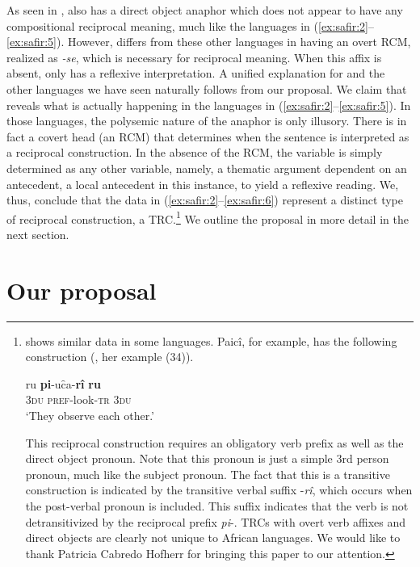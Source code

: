 \documentclass[output=paper]{langsci/langscibook}
\begin{document}
As seen in ,  also has a direct object anaphor which does not appear to have any compositional reciprocal meaning, much like the languages in (\ref{ex:safir:2}--\ref{ex:safir:5}). However,  differs from these other languages in having an overt RCM, realized as \textit{-se}, which is necessary for reciprocal meaning. When this affix is absent,  only has a reflexive interpretation. A unified explanation for  and the other languages we have seen naturally follows from our proposal. We claim that  reveals what is actually happening in the languages in (\ref{ex:safir:2}--\ref{ex:safir:5}). In those languages, the polysemic nature of the anaphor is only illusory. There is in fact a covert head (an RCM) that determines when the sentence is interpreted as a reciprocal construction. In the absence of the RCM, the variable is simply determined as any other variable, namely, a thematic argument dependent on an antecedent, a local antecedent in this instance, to yield a reflexive reading. We, thus, conclude that the data in (\ref{ex:safir:2}--\ref{ex:safir:6}) represent a distinct type of reciprocal construction, a TRC.\footnote{\citet{MoysieFaurie2008} shows similar data in some  languages. Paicî, for example, has the following construction (\citealt[121]{MoysieFaurie2008}, her example (34)).

\ea\label{ex:safir:7}
\gll  ru  \textbf{pi}-uc̑a-\textbf{rî}  \textbf{ru}\\
 \textsc{3du}  \textsc{pref}-look-\textsc{tr}  \textsc{3du}\\
\glt  ‘They observe each other.’
\z
 
This reciprocal construction requires an obligatory verb prefix as well as the direct object pronoun. Note that this pronoun is just a simple 3rd person pronoun, much like the subject pronoun. The fact that this is a transitive construction is indicated by the transitive verbal suffix -\textit{rî}, which occurs when the post-verbal pronoun is included. This suffix indicates that the verb is not detransitivized by the reciprocal prefix \textit{pi}-. TRCs with overt verb affixes and direct objects are clearly not unique to African languages. We would like to thank Patricia Cabredo Hofherr for bringing this paper to our attention.} We outline the proposal in more detail in the next section.

\section{Our proposal} \label{sec:safir:3}
\end{document}

